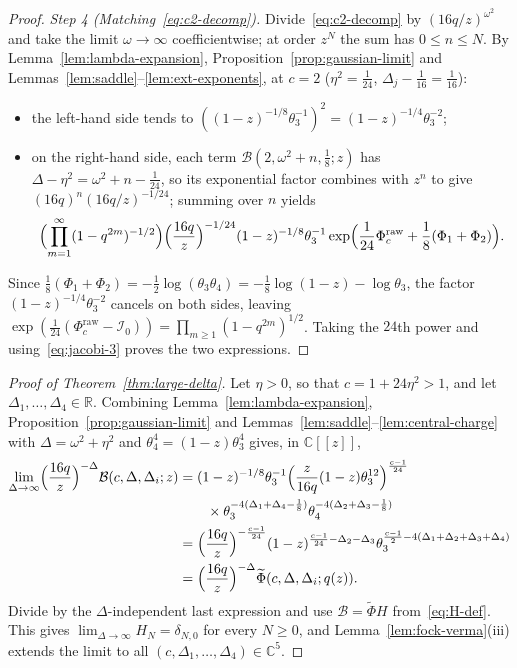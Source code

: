 \documentclass[twoside,10pt]{article}
\numberwithin{equation}{section}
\theoremstyle{slbody}
\theoremstyle{definition}
\theoremstyle{remark}
\begin{document}
\begin{proof}
\emph{Step 4 (Matching~\eqref{eq:c2-decomp}).}  Divide~\eqref{eq:c2-decomp}
by \((16q/z)^{\omega^2}\) and take the limit \(\omega\to\infty\)
coefficientwise; at order \(z^N\) the sum has \(0\leq n\leq N\).  By
Lemma~\ref{lem:lambda-expansion}, Proposition~\ref{prop:gaussian-limit} and Lemmas~\ref{lem:saddle}--\ref{lem:ext-exponents}, at \(c=2\)
(\(\eta^2=\frac{1}{24}\), \(\Delta_j-\frac{1}{16}=\frac{1}{16}\)):
\begin{itemize}\setlength{\itemsep}{1pt}
\item the left-hand side tends to
  \(((1-z)^{-1/8}\theta_3^{-1})^2=(1-z)^{-1/4}\theta_3^{-2}\);
\item on the right-hand side, each term \(\mathcal B(2,\omega^2+n,\tfrac18;z)\)
  has \(\Delta-\eta^2=\omega^2+n-\frac{1}{24}\), so its exponential factor
  combines with \(z^n\) to give \((16q)^n(16q/z)^{-1/24}\); summing over \(n\)
  yields
  \[
   \Bigl(\prod_{m=1}^\infty(1-q^{2m})^{-1/2}\Bigr)
   \Bigl(\frac{16q}{z}\Bigr)^{-1/24}(1-z)^{-1/8}\theta_3^{-1}
   \exp\Bigl(\frac{1}{24}\Phi_c^{\mathrm{raw}}+\frac18(\Phi_1+\Phi_2)\Bigr).
  \]
\end{itemize}
Since \(\frac18(\Phi_1+\Phi_2)=-\frac12\log(\theta_3\theta_4)=-\frac18\log(1-z)-\log\theta_3\),
the factor \((1-z)^{-1/4}\theta_3^{-2}\) cancels on both sides, leaving
\(\exp(\frac{1}{24}(\Phi_c^{\mathrm{raw}}-\mathcal I_0))=\prod_{m\geq1}(1-q^{2m})^{1/2}\).
Taking the \(24\)th power and using~\eqref{eq:jacobi-3} proves the two
expressions.
\end{proof}

\begin{proof}[Proof of Theorem~\ref{thm:large-delta}]
Let \(\eta>0\), so that \(c=1+24\eta^2>1\), and let
\(\Delta_1,\dots,\Delta_4\in\mathbb R\).  Combining
Lemma~\ref{lem:lambda-expansion},
Proposition~\ref{prop:gaussian-limit} and
Lemmas~\ref{lem:saddle}--\ref{lem:central-charge} with
\(\Delta=\omega^2+\eta^2\) and \(\theta_4^4=(1-z)\theta_3^4\) gives, in
\(\mathbb C[[z]]\),
\begin{align*}
 \lim_{\Delta\to\infty}\Bigl(\frac{16q}{z}\Bigr)^{-\Delta}\mathcal B(c,\Delta,\Delta_i;z)
 &=(1-z)^{-1/8}\theta_3^{-1}
  \Bigl(\frac{z}{16q}(1-z)\theta_3^{12}\Bigr)^{\frac{c-1}{24}}\\
 &\qquad\times\theta_3^{-4(\Delta_1+\Delta_4-\frac18)}
  \theta_4^{-4(\Delta_2+\Delta_3-\frac18)}\\
 &=\Bigl(\frac{16q}{z}\Bigr)^{-\frac{c-1}{24}}
  (1-z)^{\frac{c-1}{24}-\Delta_2-\Delta_3}
  \theta_3^{\frac{c-1}{2}-4(\Delta_1+\Delta_2+\Delta_3+\Delta_4)}\\
 &=\Bigl(\frac{16q}{z}\Bigr)^{-\Delta}\widetilde\Phi(c,\Delta,\Delta_i;q(z)).
\end{align*}
Divide by the \(\Delta\)-independent last expression and use
\(\mathcal B=\widetilde\Phi H\) from~\eqref{eq:H-def}.  This gives
\(\lim_{\Delta\to\infty}H_N=\delta_{N,0}\) for every \(N\geq0\), and
Lemma~\ref{lem:fock-verma}(iii) extends the limit to all
\((c,\Delta_1,\dots,\Delta_4)\in\mathbb C^5\).
\end{proof}
\end{document}
